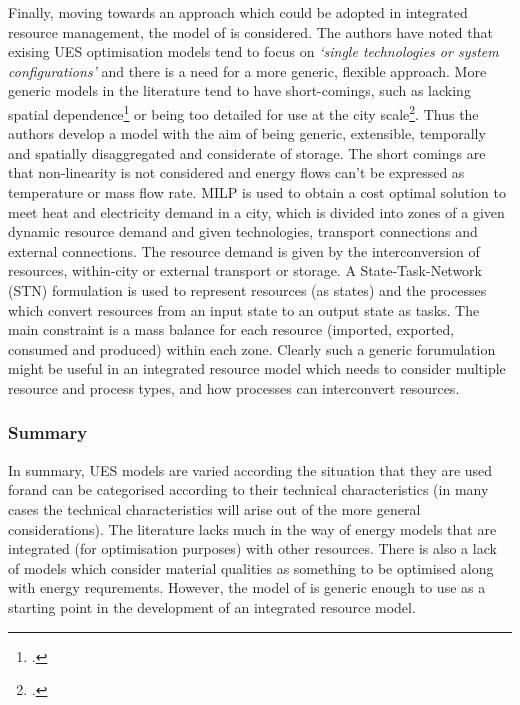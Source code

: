 Finally, moving towards an approach which could be adopted in integrated resource management, the model of \citet{Samsatli} is considered. The authors have noted that exising UES optimisation models tend to focus on \emph{`single technologies or system configurations'} and there is a need for a more generic, flexible approach. More generic models in the literature tend to have short-comings, such as lacking spatial dependence\footnote{\citet{Ren2010}.} or being too detailed for use at the city scale\footnote{\citet{Weber2011}.}. Thus the authors develop a model with the aim of being generic, extensible, temporally and spatially disaggregated and considerate of storage. The short comings are that non-linearity is not considered and energy flows can't be expressed as temperature or mass flow rate. MILP is used to obtain a cost optimal solution to meet heat and electricity demand in a city, which is divided into zones of a given dynamic resource demand and given technologies, transport connections and external connections. The resource demand is given by the interconversion of resources, within-city or external transport or storage. A State-Task-Network (STN) formulation is used to represent resources (as states) and the processes which convert resources from an input state to an output state as tasks. The main constraint is a mass balance for each resource (imported, exported, consumed and produced) within each zone. Clearly such a generic forumulation might be useful in an integrated resource model which needs to consider multiple resource and process types, and how processes can interconvert resources.

\subsubsection*{Summary}
In summary, UES models are varied according the situation that they are used forand can be categorised according to their technical characteristics (in many cases the technical characteristics will arise out of the more general considerations). The literature lacks much in the way of energy models that are integrated (for optimisation purposes) with other resources. There is also a lack of models which consider material qualities as something to be optimised along with energy requrements. However, the model of \citep{Samsatli} is generic enough to use as a starting point in the development of an integrated resource model.

